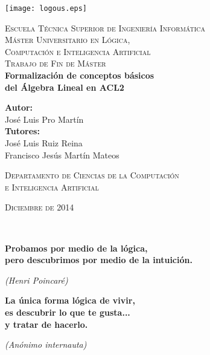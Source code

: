 \documentclass[a4paper,10pt]{article}
\begin{document}
\thispagestyle{empty}
\begin{center}
\texttt{[image: logous.eps]}	

\vspace{24pt}
\large
\textsc{Escuela Técnica Superior de Ingeniería Informática} \\

\vspace{24pt}
\LARGE
\textsc{Máster Universitario en Lógica,\\ Computación e Inteligencia Artificial} \\

\vspace{24pt}
\large
\textsc{Trabajo de Fin de Máster}  \\

\vspace{44pt}
\huge
\textbf{Formalización de conceptos básicos \\del Álgebra Lineal en ACL2 }

\vspace{44pt}
\large
\textbf{Autor:} \\ José Luis Pro Martín \\

\vspace{24pt}
\large
\textbf{Tutores:} \\ José Luis Ruiz Reina \\ Francisco Jesús Martín Mateos

\vspace{54pt}
\large
\textsc{Departamento de Ciencias de la Computación\\ e Inteligencia Artificial}

\vspace{34pt}
\large
\textsc{Diciembre de 2014}

\end{center}

\newpage
\thispagestyle{empty}
\ 
\newpage
\thispagestyle{empty}
\large
\begin{flushright}
\textbf{Probamos por medio de la lógica, \\pero descubrimos por medio de la intuición.} \par \vspace{10pt}
\emph{(Henri Poincaré)}

\par \vspace{100pt}

\textbf{La única forma lógica de vivir,\\ es descubrir lo que te gusta...\\ y tratar de hacerlo.}\par \vspace{10pt}
\emph{(Anónimo internauta)}
\end{flushright}
\normalsize
\end{document}
